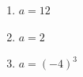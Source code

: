 %
%
  \begin{enumerate}[cols=3]
    \item $a=12$
    \item $a=2$
    \item $a=(-4)^3$
  \end{enumerate}
